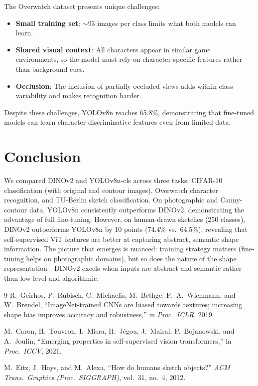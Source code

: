 \documentclass[11pt,a4paper]{article}
\begin{document}
The Overwatch dataset presents unique challenges:
\begin{itemize}
    \item \textbf{Small training set}: $\sim$93 images per class limits what both models can learn.
    \item \textbf{Shared visual context}: All characters appear in similar game environments, so the model must rely on character-specific features rather than background cues.
    \item \textbf{Occlusion}: The inclusion of partially occluded views adds within-class variability and makes recognition harder.
\end{itemize}

Despite these challenges, YOLOv8n reaches 65.8\%, demonstrating that fine-tuned models can learn character-discriminative features even from limited data.

\section{Conclusion}

We compared DINOv2 and YOLOv8n-cls across three tasks: CIFAR-10 classification (with original and contour images), Overwatch character recognition, and TU-Berlin sketch classification. On photographic and Canny-contour data, YOLOv8n consistently outperforms DINOv2, demonstrating the advantage of full fine-tuning. However, on human-drawn sketches (250 classes), DINOv2 outperforms YOLOv8n by 10 points (74.4\% vs.\ 64.5\%), revealing that self-supervised ViT features are better at capturing abstract, semantic shape information. The picture that emerges is nuanced: training strategy matters (fine-tuning helps on photographic domains), but so does the nature of the shape representation---DINOv2 excels when inputs are abstract and semantic rather than low-level and algorithmic.

\begin{thebibliography}{9}
R.~Geirhos, P.~Rubisch, C.~Michaelis, M.~Bethge, F.~A.~Wichmann, and W.~Brendel,
``ImageNet-trained CNNs are biased towards textures; increasing shape bias improves accuracy and robustness,''
in \textit{Proc.\ ICLR}, 2019.

M.~Caron, H.~Touvron, I.~Misra, H.~J{\'e}gou, J.~Mairal, P.~Bojanowski, and A.~Joulin,
``Emerging properties in self-supervised vision transformers,''
in \textit{Proc.\ ICCV}, 2021.

M.~Eitz, J.~Hays, and M.~Alexa,
``How do humans sketch objects?''
\textit{ACM Trans.\ Graphics (Proc.\ SIGGRAPH)}, vol.~31, no.~4, 2012.
\end{thebibliography}
\end{document}
